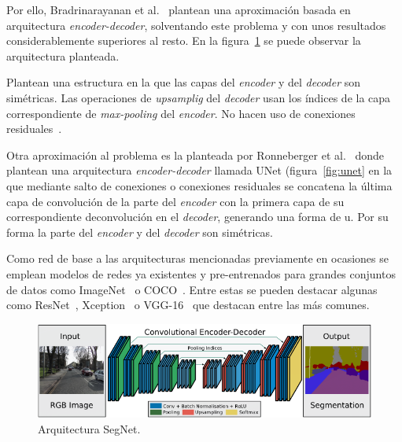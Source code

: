 \documentclass[a4paper]{article}
\begin{document}
Por ello, Bradrinarayanan et al.~\cite{encoderDecoder} plantean una aproximaci\'on basada en arquitectura \textit{encoder-decoder}, solventando este problema y con unos resultados considerablemente superiores al resto.
En la figura~\ref{fig:segnet} se puede observar la arquitectura planteada.
\newline

Plantean una estructura en la que las capas del \textit{encoder} y del \textit{decoder} son sim\'etricas.
Las operaciones de \textit{upsamplig} del \textit{decoder} usan los \'indices de la capa correspondiente de \textit{max-pooling} del \textit{encoder}.
No hacen uso de conexiones residuales~\cite{resnet}.
\newline

Otra aproximaci\'on al problema es la planteada por Ronneberger et al.~\cite{unet} donde plantean una arquitectura \textit{encoder-decoder} llamada UNet (figura~\ref{fig:unet} en la que mediante salto de conexiones o conexiones residuales se concatena la \'ultima capa de convoluci\'on de la parte del \textit{encoder} con la primera capa de su correspondiente deconvoluci\'on en el \textit{decoder}, generando una forma de u.
Por su forma la parte del \textit{encoder} y del \textit{decoder} son sim\'etricas.
\newline

Como red de base a las arquitecturas mencionadas previamente en ocasiones se emplean modelos de redes ya existentes y pre-entrenados para grandes conjuntos de datos como ImageNet~\cite{imagenet} o COCO~\cite{coco}.
Entre estas se pueden destacar algunas como ResNet~\cite{resnet}, Xception~\cite{xception} o VGG-16~\cite{vgg} que destacan entre las m\'as comunes.

\begin{figure}[hbtp]
    \centering
    \includegraphics[scale=0.5]{img/segnet.png}
    \caption{\small Arquitectura SegNet.}
    \label{fig:segnet}
\end{figure}
\end{document}
